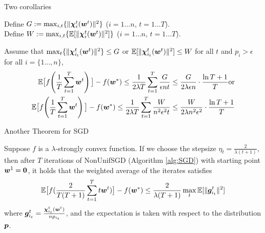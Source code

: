 
\begin{frame}{Two corollaries}
\begin{definition}\label{def:WG}
Define $G := \max_{i, t}\{ \|\bm{\chi}_{i}^t(\bm{w}^{t})\|^2\}$ ($i = 1\dots n$, $t=1\dots T$). \\
Define $W := \max_{i,t}\{\mathbb{E}[\|\bm{\chi}_{i}^t(\bm{w}^{t})\|^2]\}$ ($i = 1\dots n$, $t=1\dots T$).
\end{definition}
\begin{corollary}\label{corollary:maxsubgrad}
Assume that $\max_{t}\{\|\bm{\chi}_{i_t}^t(\bm{w}^t)\|^2\} \le G$ or $\mathbb{E}[\|\bm{\chi}_{i_t}^t(\bm{w}^t)\|^2] \le W$ for all $t$ and $p_i > \epsilon$ for all $i=\{1\dots, n\}$,
    \begin{align*}
        \mathbb{E}\big[f\!\left(\frac1T\sum_{t=1}^T \bm{w}^{t} \right)\big]- f(\bm{w}^*) \le \frac{1}{2\lambda T} \sum_{t=1}^T \frac{G}{\epsilon nt}
\le \frac{G}{2\lambda \epsilon n} \cdot \frac{\ln T+1}{T} \text{or}\\ 
        \mathbb{E}\big[f\!\left(\frac1T\sum_{t=1}^T \bm{w}^{t} \right)\big]- f(\bm{w}^*)  \le \frac{1}{2\lambda T}\sum_{t=1}^T \frac{W}{n^2\epsilon^2 t}
\le \frac{W}{2\lambda n^2\epsilon^2} \cdot \frac{\ln T+1}{T}
    \end{align*}
\end{corollary}
\end{frame}

\begin{frame}{Another Theorem for SGD}
\begin{theorem}\label{theorem:weightedSGD}
    Suppose $f$ is a $\lambda$-strongly convex function. If we choose the stepsize $\eta_t=\frac{2}{\lambda (t+1)}$, then after $T$ iterations of NonUnifSGD (Algorithm \ref{alg:SGD}) with starting point $\bm{w}^{1}=\bm{0}$, it holds that the weighted average of the iterates satisfies
    \[
        \mathbb{E}\big[f(\frac{2}{T(T+1)}\sum_{t=1}^{T}t \bm{w}^{t})\big] - f(\bm{w}^*) \le 
        \frac{2}{\lambda(T+1)} \max_{t} \mathbb{E}[\|\bm{g}_{i_t}^t\|^2]
    \]
    where $\bm{g}_{i_t}^t=\frac{\bm{\chi}_{i_t}^t(\bm{w}^{t})}{np_{i_t}}$,
    and the expectation is taken with respect to the distribution $\bm{p}$.
\end{theorem}
\end{frame}

